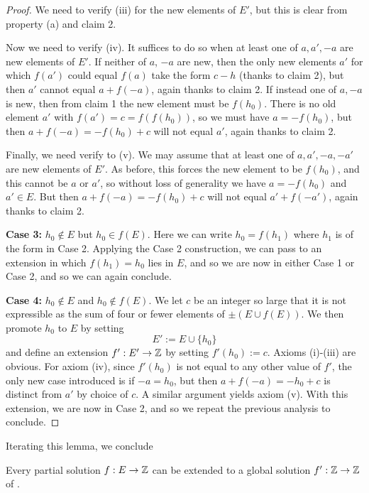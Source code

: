\begin{proof}
We need to verify (iii) for the new elements of $E'$, but this is clear from property (a) and claim 2.

Now we need to verify (iv).  It suffices to do so when at least one of $a,a',-a$ are new elements of $E'$.  If neither of $a$, $-a$ are new, then the only new elements $a'$ for which $f(a')$ could equal $f(a)$ take the form $c-h$ (thanks to claim 2), but then $a'$ cannot equal $a+f(-a)$, again thanks to claim 2.  If instead one of $a, -a$ is new, then from claim 1 the new element must be $f(h_0)$.  There is no old element $a'$ with $f(a') = c = f(f(h_0))$, so we must have $a = -f(h_0)$, but then $a + f(-a) = -f(h_0)+c$ will not equal $a'$, again thanks to claim 2.

Finally, we need verify to (v).  We may assume that at least one of $a,a',-a,-a'$ are new elements of $E'$.  As before, this forces the new element to be $f(h_0)$, and this cannot be $a$ or $a'$, so without loss of generality we have $a = -f(h_0)$ and $a' \in E$.  But then $a + f(-a) = -f(h_0)+c$ will not equal $a' + f(-a')$, again thanks to claim 2.

{\bf Case 3:} $h_0 \not \in E$ but $h_0 \in f(E)$.  Here we can write $h_0 = f(h_1)$ where $h_1$ is of the form in Case 2.  Applying the Case 2 construction, we can pass to an extension in which $f(h_1) = h_0$ lies in $E$, and so we are now in either Case 1 or Case 2, and so we can again conclude.

{\bf Case 4:} $h_0 \not \in E$ and $h_0 \not \in f(E)$.  We let $c$ be an integer so large that it is not expressible as the sum of four or fewer elements of $\pm (E \cup f(E))$.  We then promote $h_0$ to $E$ by setting
$$E' := E \cup \{h_0\}$$
and define an extension $f': E' \to \mathbb{Z}$ by setting $f'(h_0) := c$.  Axioms (i)-(iii) are obvious.  For axiom (iv), since $f'(h_0)$ is not equal to any other value of $f'$, the only new case introduced is if $-a = h_0$, but then $a+f(-a) = -h_0+c$ is distinct from $a'$ by choice of $c$.  A similar argument yields axiom (v).  With this extension, we are now in Case 2, and so we repeat the previous analysis to conclude.
\end{proof}

Iterating this lemma, we conclude

\begin{corollary}\label{dupont-iter}\leanok{} Every partial solution $f: E \to \mathbb{Z}$ can be extended to a global solution $f': \mathbb{Z} \to\mathbb{Z}$ of .
\end{corollary}

